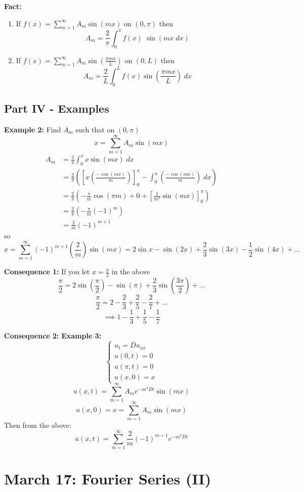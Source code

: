 \documentclass[12pt]{article}
\begin{document}
\textbf{Fact:}
\begin{enumerate}
    \item If $f(x) = \sum_{m=1}^\infty A_m \sin(mx)$ on $(0, \pi)$ then 
    \[A_m = \frac{2}{\pi} \int_0^\pi f(x) \; \sin(mx \; dx)\]
    \item If $f(x) = \sum_{m=1}^\infty A_m \sin(\frac{\pi mx}{L})$ on $(0, L)$ then 
    \[\boxed{A_m = \frac{2}{L} \int_0^L f(x) \sin(\frac{\pi m x}{L})\; dx}\]
\end{enumerate}

\subsection*{Part IV - Examples}
\textbf{Example 2:} Find $A_m$ such that on $(0, \pi)$
\[x = \sum_{m=1}^\infty A_m \sin(mx)\]
\begin{align*}
    A_m &= \frac{2}{\pi} \int_0^\pi x \sin(mx) \; dx\\
    &= \frac{2}{\pi}\left(\left[x (\frac{-\cos(mx)}{m})\right]_0^\pi - \int_0^\pi (\frac{-\cos(mx)}{m}) \; dx\right)\\
    &= \frac{2}{\pi}(-\frac{\pi}{m} \cos(\pi m) + 0 + [\frac{1}{m^2}\sin(mx)]_0^\pi)\\
    &= \frac{2}{\pi}(-\frac{\pi}{m}(-1)^m) \\
    &= \frac{2}{m}(-1)^{m+1}
\end{align*}
so 
\[x= \sum_{m=1}^\infty (-1)^{m+1}\left(\frac{2}{m}\right)\sin(mx) = 2\sin x  -\sin(2x) + \frac{2}{3}\sin(3x) - \frac{1}{2}\sin(4x) + ...\]

\textbf{Consequence 1:} If you let $x = \frac{\pi}{2}$ in the above 
\[\frac{\pi}{2} = 2 \sin(\frac{\pi}{2}) - \sin(\pi) + \frac{2}{3}\sin(\frac{3\pi}{2}) + ...\]
\[\frac{\pi}{2} = 2 - \frac{2}{3} + \frac{2}{5} - \frac{2}{7} + ...\]
\[\implies 1 - \frac{1}{3} + \frac{1}{5} - \frac{1}{7}\]

\textbf{Consequence 2:} 
\textbf{Example 3:} 
\[\begin{cases}
    u_t = Du_{xx}\\
    u(0, t) = 0\\
    u(\pi, t) = 0\\
    u(x, 0) = x
\end{cases}\]
\[u(x, t) = \sum_{m=1}^\infty A_m e^{-m^2Dt}\sin(mx)\]
\[u(x, 0) = x = \sum_{m=1}^\infty A_m \sin(mx)\]
Then from the above:
\[\boxed{u(x, t) = \sum_{m=1}^\infty \frac{2}{m}(-1)^{m+1}e^{-m^2Dt}}\]

\section{March 17: Fourier Series (II)}
\end{document}
